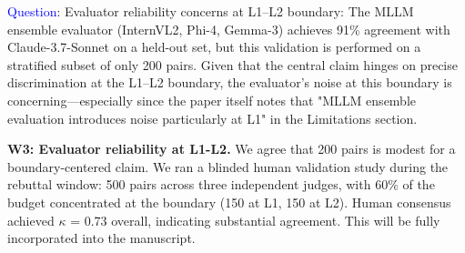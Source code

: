 


\textcolor{blue}{Question}: Evaluator reliability concerns at L1–L2 boundary: The MLLM ensemble evaluator (InternVL2, Phi-4, Gemma-3) achieves 91\% agreement with Claude-3.7-Sonnet on a held-out set, but this validation is performed on a stratified subset of only 200 pairs. Given that the central claim hinges on precise discrimination at the L1–L2 boundary, the evaluator's noise at this boundary is concerning—especially since the paper itself notes that "MLLM ensemble evaluation introduces noise particularly at L1" in the Limitations section.



\textbf{W3: Evaluator reliability at L1-L2.} We agree that 200 pairs is modest for a boundary-centered claim. We ran a blinded human validation study during the rebuttal window: 500 pairs across three independent judges, with 60\% of the budget concentrated at the boundary (150 at L1, 150 at L2). Human consensus achieved $\kappa$ = 0.73 overall, indicating substantial agreement. This will be fully incorporated into the manuscript.




